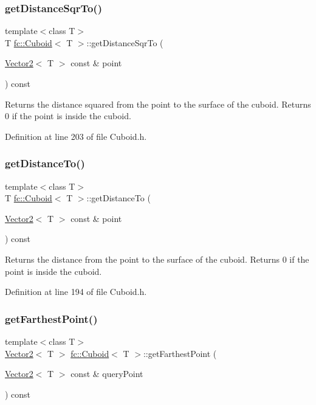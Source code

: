 \subsubsection{\texorpdfstring{get\+Distance\+Sqr\+To()}{getDistanceSqrTo()}}
{\footnotesize\ttfamily template$<$class T$>$ \\
T \hyperlink{classfc_1_1Cuboid}{fc\+::\+Cuboid}$<$ T $>$\+::get\+Distance\+Sqr\+To (\begin{DoxyParamCaption}\item[{\hyperlink{classfc_1_1Vector2}{Vector2}$<$ T $>$ const \&}]{point }\end{DoxyParamCaption}) const}

Returns the distance squared from the point to the surface of the cuboid. Returns 0 if the point is inside the cuboid. 

Definition at line 203 of file Cuboid.\+h.

\mbox{\label{classfc_1_1Cuboid_aad6557d3aba44f3230a5376dbe172343}} 
\subsubsection{\texorpdfstring{get\+Distance\+To()}{getDistanceTo()}}
{\footnotesize\ttfamily template$<$class T$>$ \\
T \hyperlink{classfc_1_1Cuboid}{fc\+::\+Cuboid}$<$ T $>$\+::get\+Distance\+To (\begin{DoxyParamCaption}\item[{\hyperlink{classfc_1_1Vector2}{Vector2}$<$ T $>$ const \&}]{point }\end{DoxyParamCaption}) const}

Returns the distance from the point to the surface of the cuboid. Returns 0 if the point is inside the cuboid. 

Definition at line 194 of file Cuboid.\+h.

\mbox{\label{classfc_1_1Cuboid_add357a628839e98f3dbca1b6d4ca9700}} 
\subsubsection{\texorpdfstring{get\+Farthest\+Point()}{getFarthestPoint()}}
{\footnotesize\ttfamily template$<$class T$>$ \\
\hyperlink{classfc_1_1Vector2}{Vector2}$<$ T $>$ \hyperlink{classfc_1_1Cuboid}{fc\+::\+Cuboid}$<$ T $>$\+::get\+Farthest\+Point (\begin{DoxyParamCaption}\item[{\hyperlink{classfc_1_1Vector2}{Vector2}$<$ T $>$ const \&}]{query\+Point }\end{DoxyParamCaption}) const}

